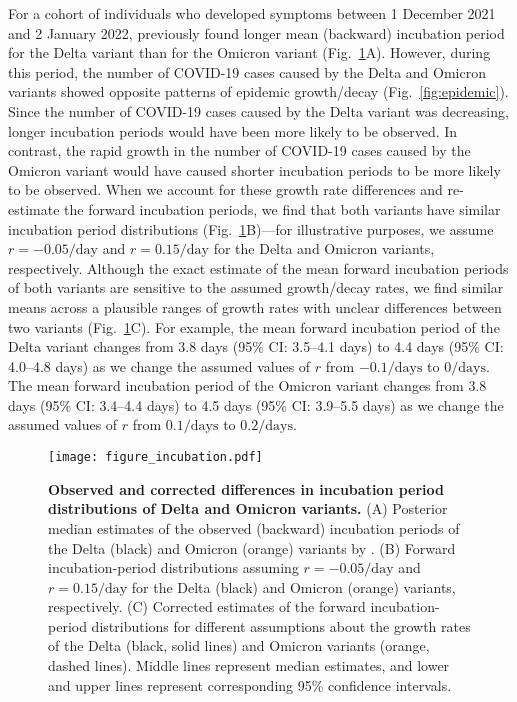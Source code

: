 \documentclass[12pt]{article}
\newcommand{\fref}[1]{Fig.~\ref{fig:#1}}
\begin{document}
For a cohort of individuals who developed symptoms between 1 December 2021 and 2 January 2022, \citep{backer2021omicron} previously found longer mean (backward) incubation period for the Delta variant than for the Omicron variant (\fref{incubation}A).
However, during this period, the number of COVID-19 cases caused by the Delta and Omicron variants showed opposite patterns of epidemic growth/decay (\fref{epidemic}).
Since the number of COVID-19 cases caused by the Delta variant was decreasing, longer incubation periods would have been more likely to be observed.
In contrast, the rapid growth in the number of COVID-19 cases caused by the Omicron variant would have caused shorter incubation periods to be more likely to be observed.
When we account for these growth rate differences and re-estimate the forward incubation periods, we find that both variants have similar incubation period distributions (\fref{incubation}B)---for illustrative purposes, we assume $r=-0.05/\mathrm{day}$ and $r=0.15/\mathrm{day}$ for the Delta and Omicron variants, respectively.
Although the exact estimate of the mean forward incubation periods of both variants are sensitive to the assumed growth/decay rates, we find similar means across a plausible ranges of growth rates with unclear differences between two variants (\fref{incubation}C).
For example, the mean forward incubation period of the Delta variant changes from 3.8 days (95\% CI: 3.5--4.1 days) to 4.4 days (95\% CI: 4.0--4.8 days) as we change the assumed values of $r$ from $-0.1/\mathrm{days}$ to $0/\mathrm{days}$.
The mean forward incubation period of the Omicron variant changes from 3.8 days (95\% CI: 3.4--4.4 days) to 4.5 days (95\% CI: 3.9--5.5 days) as we change the assumed values of $r$ from $0.1/\mathrm{days}$ to $0.2/\mathrm{days}$.

\begin{figure}[!th]
\texttt{[image: figure\_incubation.pdf]}
\caption{
\textbf{Observed and corrected differences in incubation period distributions of Delta and Omicron variants.}
(A) Posterior median estimates of the observed (backward) incubation periods of the Delta (black) and Omicron (orange) variants by \cite{backer2021omicron}.
(B) Forward incubation-period distributions assuming $r=-0.05/\mathrm{day}$ and $r=0.15/\mathrm{day}$ for the Delta (black) and Omicron (orange) variants, respectively.
(C) Corrected estimates of the forward incubation-period distributions for different assumptions about the growth rates of the Delta (black, solid lines) and Omicron variants (orange, dashed lines).
Middle lines represent median estimates, and lower and upper lines represent corresponding 95\% confidence intervals.
\label{fig:incubation}
}
\end{figure}
\end{document}
